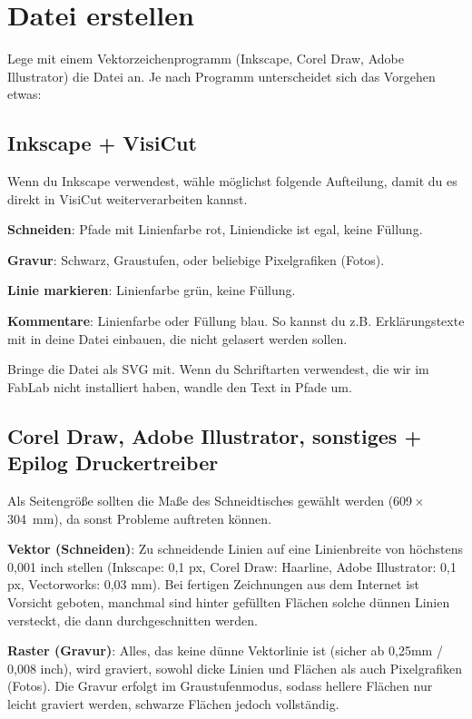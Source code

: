 \documentclass{\basedir/fablab-document}
\begin{document}
\section{Datei erstellen}
Lege mit einem Vektorzeichenprogramm (Inkscape, Corel Draw, Adobe Illustrator) die Datei an. Je nach Programm unterscheidet sich das Vorgehen etwas:


\subsection{Inkscape + VisiCut}
Wenn du Inkscape verwendest, wähle möglichst folgende Aufteilung, damit du es direkt in VisiCut weiterverarbeiten kannst.

\textbf{Schneiden}: Pfade mit Linienfarbe rot, Liniendicke ist egal, keine Füllung.

\textbf{Gravur}: Schwarz, Graustufen, oder beliebige Pixelgrafiken (Fotos).

\textbf{Linie markieren}: Linienfarbe grün, keine Füllung.

\textbf{Kommentare}: Linienfarbe oder Füllung blau. So kannst du z.B. Erklärungstexte mit in deine Datei einbauen, die nicht gelasert werden sollen.

Bringe die Datei als SVG mit. Wenn du Schriftarten verwendest, die wir im FabLab nicht installiert haben, wandle den Text in Pfade um.



\subsection{Corel Draw, Adobe Illustrator, sonstiges + Epilog Druckertreiber}
Als Seitengröße sollten die Maße des Schneidtisches gewählt werden (609\,$\times$\,304~mm), da sonst Probleme auftreten können.

\textbf{Vektor (Schneiden)}: Zu schneidende Linien auf eine Linienbreite von höchstens 0,001 inch stellen (Inkscape: 0,1 px, Corel Draw: Haarline, Adobe Illustrator: 0,1 px, Vectorworks: 0,03 mm). Bei fertigen Zeichnungen aus dem Internet ist Vorsicht geboten, manchmal sind hinter gefüllten Flächen solche dünnen Linien versteckt, die dann durchgeschnitten werden.

\textbf{Raster (Gravur)}: Alles, das keine dünne Vektorlinie ist (sicher ab 0,25mm / 0,008 inch), wird graviert, sowohl dicke Linien und Flächen als auch Pixelgrafiken (Fotos). Die Gravur erfolgt im Graustufenmodus, sodass hellere Flächen nur leicht graviert werden, schwarze Flächen jedoch vollständig.
\end{document}
